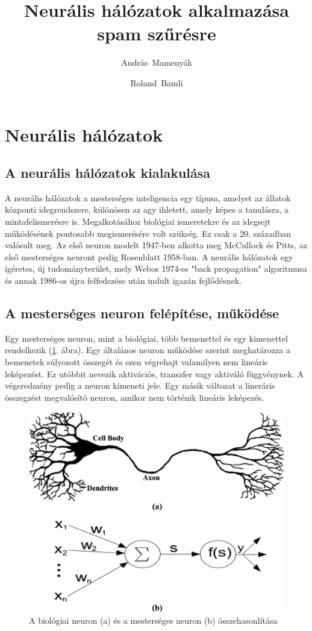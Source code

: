 \documentclass[a4paper]{article}
\author[1]{András~Mamenyák}
\author[1]{Roland~Bamli}
\affil[1]{Mérnök informatikus (BSc) szakos hallgató, Debreceni Egyetem}
\title{Neurális hálózatok alkalmazása spam szűrésre}
\begin{document}
\maketitle

\section{Neurális hálózatok}
\subsection{A neurális hálózatok kialakulása}
A neurális hálózatok a mesterséges inteligencia egy típusa, amelyet az állatok központi idegrendszere, különösen az agy ihletett, amely képes a tanulásra, a mintafelismerésre is. Megalkotásához biológiai ismeretekre és az idegsejt működésének pontosabb megismerésére volt szükség. Ez csak a 20. században valósult meg. Az első neuron modelt 1947-ben alkotta meg McCullock és Pitts, az első mesterséges neuront pedig Rosenblatt 1958-ban. A neurális hálózatok egy ígéretes, új tudományterület, mely Webos 1974-es "back propagation" algoritmusa és annak 1986-os újra felfedezése után indult igazán fejlődésnek.

\subsection{A mesterséges neuron felépítése, működése}
Egy mesterséges neuron, mint a biológiai, több bemenettel és egy kimenettel rendelkezik (\ref{artifical_neuron}. ábra). Egy általános neuron működése szerint  meghatározza a bemenetek súlyozott összegét és ezen végrehajt valamilyen nem lineáris leképezést. Ez utóbbit nevezik aktivációs, transzfer vagy aktiváló függvénynek. A végeredmény pedig a neuron kimeneti jele. Egy másik változat a lineráris összegzést megvalósító neuron, amikor nem történik lineáris leképezés.

\begin{figure}
  \centering
  \includegraphics[scale=0.6]{artifical_neuron}
  \caption{A biológiai neuron (a) és a mesterséges neuron (b) összehasonlítása}
  \label{artifical_neuron}
\end{figure}
\end{document}
